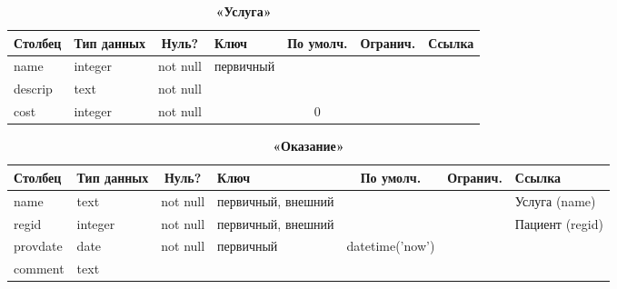\documentclass[14pt,a4paper,russian]{extreport}
\begin{document}
\begin{table}[h]
    \caption{ } 
    \begin{subtable}[t]{\textwidth}
        \caption{\textbf{«Услуга»}}
    \begin{tabularx}{\textwidth}{| X | X | c | X | c | c | X |}
        \hline
        \textbf{Столбец} & \textbf{Тип данных} & \textbf{Нуль?} & \textbf{Ключ} & \textbf{По
        умолч.} & \textbf{Огранич.} & \textbf{Ссылка} \\ \hline
        name & integer & not null & первичный & & & \\ \hline
        descrip & text & not null & & & & \\ \hline
        cost & integer & not null & & 0 & & \\ \hline
    \end{tabularx}
    \end{subtable}
    \label{table:serv}
\end{table}


\begin{table}[h]
    \caption{ } 
    \begin{subtable}[t]{\textwidth}
        \caption{\textbf{«Оказание»}}
    \begin{tabularx}{\textwidth}{| X | X | c | X | c | c | X |}
        \hline
        \textbf{Столбец} & \textbf{Тип данных} & \textbf{Нуль?} & \textbf{Ключ} & \textbf{По
        умолч.} & \textbf{Огранич.} & \textbf{Ссылка} \\ \hline
        name & text & not null & первичный, внешний & & &  Услуга (name) \\ \hline
        regid & integer & not null & первичный, внешний & & & Пациент (regid) \\ \hline
        provdate & date & not null & первичный & datetime('now') &  & \\ \hline
        comment & text & & & & & \\ \hline
    \end{tabularx}
    \end{subtable}
    \label{table:servprovision}
\end{table}
\end{document}
